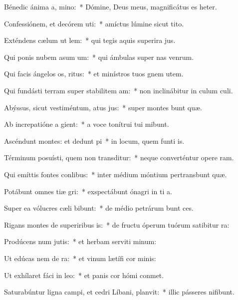 \item Bénedic ánima a, mino:~* Dómine, Deus meus, magnificátus es heter.
\item Confessiónem, et decórem uti:~* amíctus lúmine sicut tito.
\item Exténdens cælum ut lem:~* qui tegis aquis superira jus.
\item Qui ponis nubem asum um:~* qui ámbulas super nas venrum.
\item Qui facis ángelos os, ritus:~* et minístros tuos gnem utem.
\item Qui fundásti terram super stabilitem am:~* non inclinábitur in culum culi.
\item Abýssus, sicut vestiméntum, atus jus:~* super montes bunt quæ.
\item Ab increpatióne a gient:~* a voce tonítrui tui mibunt.
\item Ascéndunt montes: et dedunt pi~* in locum, quem funti is.
\item Términum posuísti, quem non transditur:~* neque converténtur opere ram.
\item Qui emíttis fontes  conlibus:~* inter médium móntium pertransbunt quæ.
\item Potábunt omnes tiæ gri:~* exspectábunt ónagri in ti a.
\item Super ea vólucres cæli bibunt:~* de médio petrárum bunt ces.
\item Rigans montes de superiribus is:~* de fructu óperum tuórum satibitur ra:
\item Prodúcens num jutis:~* et herbam serviti minum:
\item Ut edúcas nem de ra:~* et vinum lætífi cor minis:
\item Ut exhílaret fáci in leo:~* et panis cor hómi conmet.
\item Saturabúntur ligna campi, et cedri Líbani,  planvit:~* illic pásseres nifibunt.
